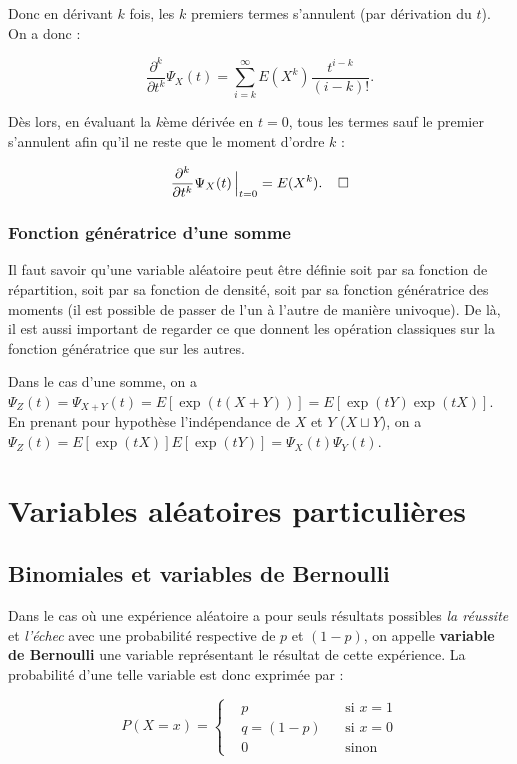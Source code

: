 \documentclass{article}
\begin{document}
		Donc en dérivant $k$ fois, les $k$ premiers termes s'annulent (par dérivation du $t$). On a donc :

		\[\frac {\partial^k}{\partial t^k}\Psi_X(t) = \sum_{i=k}^\infty E(X^k)\frac {t^{i-k}}{(i-k)!}.\]

		Dès lors, en évaluant la $k$ème dérivée en $t = 0$, tous les termes sauf le premier s'annulent afin qu'il ne reste que le moment d'ordre $k$ :

		\begin{align}
			\frac {\partial^k}{\partial t^k}\Psi_X(t)\sVert[2]_{t=0} = E(X^k).\;\;\;\;\square
		\end{align}

		\subsubsection{Fonction génératrice d'une somme}
			Il faut savoir qu'une variable aléatoire peut être définie soit par sa fonction de répartition, soit par sa fonction de densité, soit par sa fonction génératrice
			des moments (il est possible de passer de l'un à l'autre de manière univoque). De là, il est aussi important de regarder ce que donnent les opération classiques
			sur la fonction génératrice que sur les autres.

			Dans le cas d'une somme, on a $\Psi_Z(t) = \Psi_{X+Y}(t) = E[\exp(t(X+Y))] = E[\exp(tY)\exp(tX)]$. En prenant pour hypothèse l'indépendance de $X$ et $Y$
			($X \sqcup Y$), on a $\Psi_Z(t) = E[\exp(tX)]E[\exp(tY)] = \Psi_X(t)\Psi_Y(t)$.

\section{Variables aléatoires particulières}
	\subsection{Binomiales et variables de Bernoulli}
		Dans le cas où une expérience aléatoire a pour seuls résultats possibles \textit{la réussite} et \textit{l'échec} avec une probabilité respective de $p$ et $(1-p)$,
		on appelle \textbf{variable de Bernoulli} une variable représentant le résultat de cette expérience. La probabilité d'une telle variable est donc exprimée par :

		\[P(X = x) = \left\{\begin{aligned}&p &\text{ si $x = 1$}\\&q=(1-p)\;\; &\text{ si $x = 0$}\\&0 &\text{ sinon}\end{aligned}\right.\]
\end{document}
